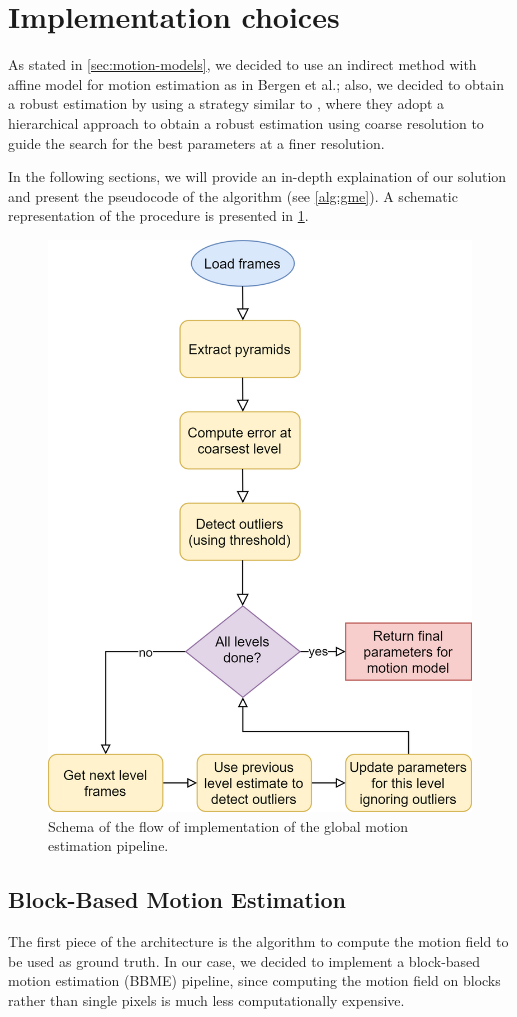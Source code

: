 \section{Implementation choices}
\label{sec:03-implementation}

As stated in \cref{sec:motion-models}, we decided to use an indirect method with affine model for motion estimation as in Bergen et al.\cite{Bergen92}; also, we decided to obtain a robust estimation by using a strategy similar to \cite{Dufeaux2000,Ayer94,He01}, where they adopt a hierarchical approach to obtain a robust estimation using coarse resolution to guide the search for the best parameters at a finer resolution.

In the following sections, we will provide an in-depth explaination of our solution and present the pseudocode of the algorithm (see \cref{alg:gme}). A schematic representation of the procedure is presented in \cref{fig:implementation-flow}.

\begin{figure}
    \centering
    \includegraphics[width=.7\linewidth]{../assets/images/implementation-flow.png}
    \caption{Schema of the flow of implementation of the global motion estimation pipeline.}
    \label{fig:implementation-flow}
\end{figure}

\subsection{Block-Based Motion Estimation}
\label{sec:BBME}
The first piece of the architecture is the algorithm to compute the motion field to be used as ground truth.
In our case, we decided to implement a block-based motion estimation (BBME) pipeline, since computing the motion field on blocks rather than single pixels is much less computationally expensive.

